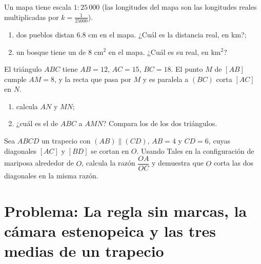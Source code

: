 \begin{exercise}[$\star\star$]\label{exo:g9:thales:7}
Un mapa tiene escala $1 : 25\,000$ (las longitudes del mapa son las longitudes reales
multiplicadas por $k = \frac{1}{25000}$).
\begin{enumerate}
  \item dos pueblos distan $6.8$ cm en el mapa. ¿Cuál es la distancia
        real, en km?;
  \item un bosque tiene un  de $8$ cm$^2$ en el mapa. ¿Cuál es su
         real, en km$^2$?
\end{enumerate}
\end{exercise}

\begin{exercise}[$\star\star$]\label{exo:g9:thales:8}
El triángulo $ABC$ tiene $AB = 12$, $AC = 15$, $BC = 18$. El punto $M$ de
$[AB]$ cumple $AM = 8$, y la recta que pasa por $M$ y es paralela a $(BC)$
corta $[AC]$ en $N$.
\begin{enumerate}
  \item calcula $AN$ y $MN$;
  \item ¿cuál es el  de $ABC$ a $AMN$? Compara los
         de los dos triángulos.
\end{enumerate}
\end{exercise}

\begin{exercise}[$\star\star\star$]\label{exo:g9:thales:9}
Sea $ABCD$ un trapecio con $(AB) \parallel (CD)$, $AB = 4$ y
$CD = 6$, cuyas diagonales $[AC]$ y $[BD]$ se cortan en $O$.
Usando Tales en la configuración de mariposa alrededor de $O$, calcula la
razón $\dfrac{OA}{OC}$ y demuestra que $O$ corta las dos diagonales en la
misma razón.
\end{exercise}

\section{Problema: La regla sin marcas, la cámara estenopeica y las
tres medias de un trapecio}

